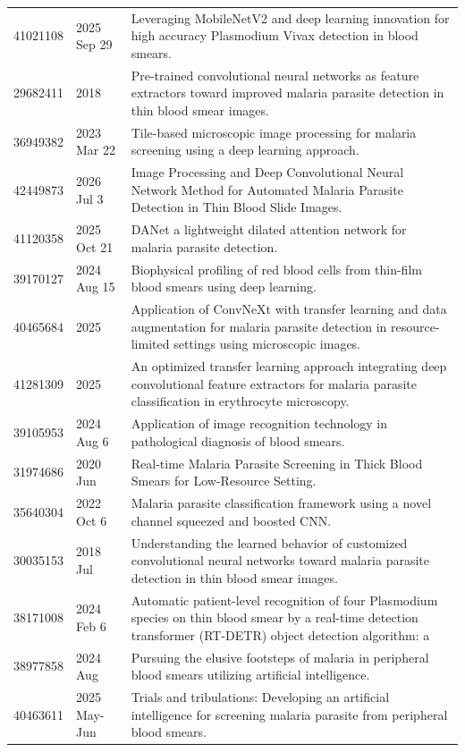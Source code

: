 \begin{longtable}{llp{9.5cm}}
41021108 & 2025 Sep 29 & Leveraging MobileNetV2 and deep learning innovation for high accuracy Plasmodium Vivax detection in blood smears. \\
29682411 & 2018 & Pre-trained convolutional neural networks as feature extractors toward improved malaria parasite detection in thin blood smear images. \\
36949382 & 2023 Mar 22 & Tile-based microscopic image processing for malaria screening using a deep learning approach. \\
42449873 & 2026 Jul 3 & Image Processing and Deep Convolutional Neural Network Method for Automated Malaria Parasite Detection in Thin Blood Slide Images. \\
41120358 & 2025 Oct 21 & DANet a lightweight dilated attention network for malaria parasite detection. \\
39170127 & 2024 Aug 15 & Biophysical profiling of red blood cells from thin-film blood smears using deep learning. \\
40465684 & 2025 & Application of ConvNeXt with transfer learning and data augmentation for malaria parasite detection in resource-limited settings using microscopic images. \\
41281309 & 2025 & An optimized transfer learning approach integrating deep convolutional feature extractors for malaria parasite classification in erythrocyte microscopy. \\
39105953 & 2024 Aug 6 & Application of image recognition technology in pathological diagnosis of blood smears. \\
31974686 & 2020 Jun & Real-time Malaria Parasite Screening in Thick Blood Smears for Low-Resource Setting. \\
35640304 & 2022 Oct 6 & Malaria parasite classification framework using a novel channel squeezed and boosted CNN. \\
30035153 & 2018 Jul & Understanding the learned behavior of customized convolutional neural networks toward malaria parasite detection in thin blood smear images. \\
38171008 & 2024 Feb 6 & Automatic patient-level recognition of four Plasmodium species on thin blood smear by a real-time detection transformer (RT-DETR) object detection algorithm: a  \\
38977858 & 2024 Aug & Pursuing the elusive footsteps of malaria in peripheral blood smears utilizing artificial intelligence. \\
40463611 & 2025 May-Jun & Trials and tribulations: Developing an artificial intelligence for screening malaria parasite from peripheral blood smears. \\

\end{longtable}

